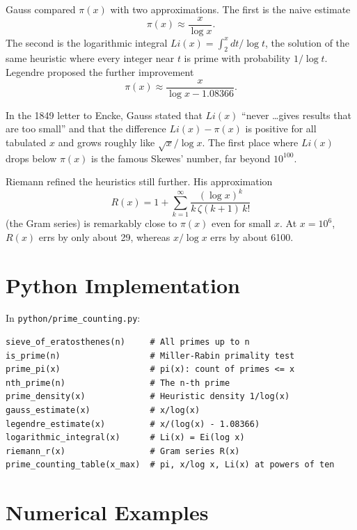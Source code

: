Gauss compared $\pi(x)$ with two approximations. The first is the naive estimate
\[
\pi(x) \approx \frac{x}{\log x}.
\]
The second is the logarithmic integral $Li(x) = \int_2^x dt / \log t$, the solution of the same heuristic where every integer near $t$ is prime with probability $1/\log t$. Legendre proposed the further improvement
\[
\pi(x) \approx \frac{x}{\log x - 1.08366}.
\]

\begin{remark}
In the 1849 letter to Encke, Gauss stated that $Li(x)$ ``never \dots gives results that are too small'' and that the difference $Li(x) - \pi(x)$ is positive for all tabulated $x$ and grows roughly like $\sqrt{x} / \log x$. The first place where $Li(x)$ drops below $\pi(x)$ is the famous  Skewes' number, far beyond $10^{100}$.
\end{remark}

Riemann refined the heuristics still further. His approximation
\[
R(x) = 1 + \sum_{k=1}^{\infty} \frac{(\log x)^k}{k\, \zeta(k+1)\, k!}
\]
(the Gram series) is remarkably close to $\pi(x)$ even for small $x$. At $x = 10^6$, $R(x)$ errs by only about 29, whereas $x/\log x$ errs by about 6100.

\section{Python Implementation}

In \texttt{python/prime\_counting.py}:

\begin{lstlisting}[style=python, caption={Key functions in python/prime\_counting.py}]
sieve_of_eratosthenes(n)     # All primes up to n
is_prime(n)                  # Miller-Rabin primality test
prime_pi(x)                  # pi(x): count of primes <= x
nth_prime(n)                 # The n-th prime
prime_density(x)             # Heuristic density 1/log(x)
gauss_estimate(x)            # x/log(x)
legendre_estimate(x)         # x/(log(x) - 1.08366)
logarithmic_integral(x)      # Li(x) = Ei(log x)
riemann_r(x)                 # Gram series R(x)
prime_counting_table(x_max)  # pi, x/log x, Li(x) at powers of ten
\end{lstlisting}

\section{Numerical Examples}

